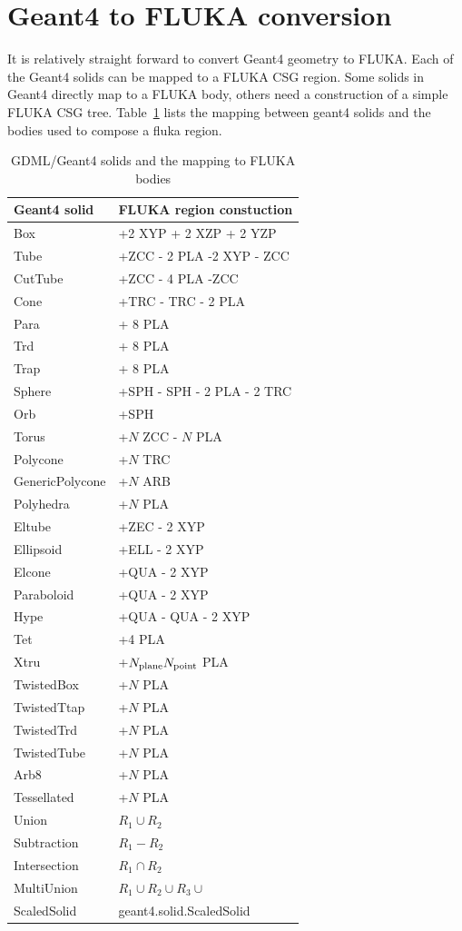 \documentclass[final,5p,times,twocolumn]{elsarticle}
\begin{document}
\section{Geant4 to FLUKA conversion}
It is relatively straight forward to convert Geant4 geometry to FLUKA. Each of the Geant4 solids can be mapped to a FLUKA CSG region.
Some solids in Geant4 directly map to a FLUKA body, others need a construction of a simple FLUKA CSG tree. Table~\ref{tab:geant2fluka}
lists the mapping between geant4 solids and the bodies used to compose a fluka region.


\begin{table}[hbt!]
\centering
\begin{tabular}{| l | l | } \hline
Geant4 solid			& FLUKA region constuction		\\ \hline
Box					& +2 XYP + 2 XZP + 2 YZP 		\\
Tube					& +ZCC - 2 PLA -2 XYP - ZCC	 	\\
CutTube				& +ZCC - 4 PLA -ZCC			\\
Cone				& +TRC - TRC - 2 PLA 			\\
Para					& + 8 PLA						\\
Trd					& + 8 PLA						\\
Trap					& + 8 PLA						\\
Sphere				& +SPH - SPH  - 2 PLA - 2 TRC	\\
Orb					& +SPH						\\
Torus				& +$N$ ZCC  - $N$ PLA			\\
Polycone				& +$N$ TRC					\\
GenericPolycone		& +$N$ ARB					\\
Polyhedra				& +$N$ PLA					\\
Eltube				& +ZEC  - 2 XYP				\\
Ellipsoid				& +ELL - 2 XYP		 			\\
Elcone				& +QUA - 2 XYP				\\
Paraboloid			& +QUA - 2 XYP				\\
Hype					& +QUA - QUA - 2 XYP			\\
Tet					& +4 PLA						\\
Xtru					& +$N_{\rm plane} N_{\rm point}$ PLA \\
TwistedBox			& +$N$ PLA					\\
TwistedTtap			& +$N$ PLA					\\
TwistedTrd			& +$N$ PLA				 	\\
TwistedTube			& +$N$ PLA					\\
Arb8					& +$N$ PLA					\\
Tessellated			& +$N$ PLA				 	\\
Union				& $R_1 \cup R_2$				\\
Subtraction			& $R_1 - R_2$					\\
Intersection			& $R_1 \cap R_2$				\\
MultiUnion			& $R_1 \cup R_2 \cup R_3 \cup$	\\
ScaledSolid			& geant4.solid.ScaledSolid		\\ \hline				
\end{tabular}
\label{tab:geant2fluka}
\caption{GDML/Geant4 solids and the mapping to FLUKA bodies}
\end{table}
\end{document}
